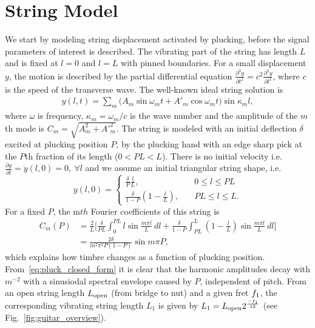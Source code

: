 \documentclass{article}
\begin{document}
\section{String Model} %
\label{sec:signal_model}
\vspace{-.6mm}
We start by modeling string displacement activated by plucking, before the signal parameters of interest is described. 
The vibrating part of the string has length $L$ and is fixed at $l=0$ and $l=L$ with pinned boundaries. %
For a small displacement $y$, the motion is described by the partial differential equation $\frac{\partial^2 y}{\partial t^2} = c^2\frac{\partial^2 y}{\partial l^2}$, where $c$ is the speed of the transverse wave. The well-known ideal string solution is ~\cite{fletcher:principles_of_vibration_and_sound}
\begin{align}
     y(l,t) = \sum_m \big(A_m \sin{\omega_mt} + A'_m \cos{\omega_mt}\big) \sin{\kappa_ml},
\end{align}
%
where $\omega$ is frequency, $\kappa_m=\omega_m/c$ is the wave number and the amplitude of the $m$th mode is $C_m\!\!=\!\!\sqrt{A_m^2\!+\!{A'}_m^2}$. 
%
The string is modeled with an initial deflection $\delta$ excited at plucking position $P$, by the plucking hand with an edge sharp pick at the $P$th fraction of its length ($0\!\! <\!\! PL\!\! <\!\! L$). There is no initial velocity i.e. $ \frac{\partial y}{\partial l} \!\!= \!\dot{y}(l,0)\!=0, \  \forall l$ and we assume an initial triangular string shape, i.e. 
\begin{equation}
     y(l,0) =\begin{cases}
               \frac{\delta}{P}\frac{l}{L}, \quad & 0\leq l \leq PL\\
               \frac{\delta}{1\!-\!P}(1\!-\!\frac{l}{L}),        \quad & PL\leq l \leq L. 
            \end{cases}\label{eq:string_initialization}
\end{equation}
For a fixed $P$, the m$th$ Fourier coefficients of this string is 
\begin{align}
    C_m(P) \!\! &= \!\! \frac{2}{L}\bigg[\! \frac{\delta}{PL} \! \int_0^{PL}\!\!\!\!\!\!\!\!\! l \sin{\!\frac{m\pi l\!}{L}}\:\! dl\! 
        + \!\frac{\delta}{1\!-\!P}\!\!\! \int_{PL}^L \!\!\!(1\!-\!\frac{l}{L}) \sin{\! \frac{m\pi l\!}{L}}\:\! dl \bigg]\nonumber \\
        &= \frac{2\delta}{m^2 \pi^2 P(1-P)} \sin{m \pi P }, \label{eq:pluck_closed_form}
\end{align}
which explains how timbre changes as a function of plucking position. From~\eqref{eq:pluck_closed_form} it is clear that the harmonic amplitudes decay with $m^{-2}$ with a sinusiodal spectral envelope caused by $P$, independent of pitch. From an open string length $L_{\textup{open}}$ (from bridge to nut) and a given fret $f_1$, the corresponding vibrating string length $L_1$ is given by $L_1 = L_{\textup{open}}  2^\frac{-f_1}{12}$ (see Fig.~\ref{fig:guitar_overview}).
\end{document}
